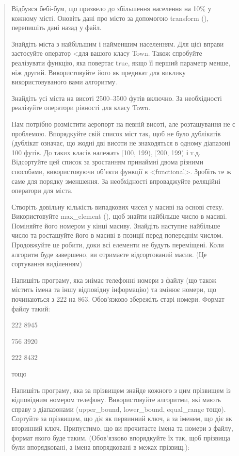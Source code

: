 \documentclass[]{article}
\begin{document}
\begin{quote}
Відбувся бебі-бум, що призвело до збільшення населення на 10\% у кожному
місті. Оновіть дані про місто за допомогою transform (), перепишіть дані
назад у файл.

Знайдіть міста з найбільшим і найменшим населенням. Для цієї вправи
застосуйте оператор \textless{}для вашого класу Town. Також спробуйте
реалізувати функцію, яка повертає true, якщо її перший параметр менше,
ніж другий. Використовуйте його як предикат для виклику
використовуваного вами алгоритму.

Знайдіть усі міста на висоті 2500--3500 футів включно. За необхідності
реалізуйте оператори рівності для класу Town.

Нам потрібно розмістити аеропорт на певній висоті, але розташування не є
проблемою. Впорядкуйте свій список міст так, щоб не було дублікатів
(дублікат означає, що жодні дві висоти не знаходяться в одному діапазоні
100 футів. До таких класів належать {[}100, 199), {[}200, 199) і т.д.
Відсортуйте цей список за зростанням принаймні двома різними способами,
використовуючи об'єкти функції в \textless{}functional\textgreater{}.
Зробіть те ж саме для порядку зменшення. За необхідності впроваджуйте
реляційні оператори для міста.

Створіть довільну кількість випадкових чисел у масиві на основі стеку.
Використовуйте max\_element (), щоб знайти найбільше число в масиві.
Поміняйте його номером у кінці масиву. Знайдіть наступне найбільше число
та росташуйте його в масиві в позиції перед попереднім числом.
Продовжуйте це робити, доки всі елементи не будуть переміщені. Коли
алгоритм буде завершено, ви отримаєте відсортований масив. (Це
сортування виділенням)

Напишіть програму, яка знімає телефонні номери з файлу (що також містить
імена та іншу відповідну інформацію) та змінює номери, що починаються з
222 на 863. Обов'язково збережіть старі номери. Формат файлу такий:

222 8945

756 3920

222 8432

тощо

Напишіть програму, яка за прізвищем знайде кожного з цим прізвищем із
відповідним номером телефону. Використовуйте алгоритми, які мають справу
з діапазонами (upper\_bound, lower\_bound, equal\_range тощо). Сортуйте
за прізвищем, що діє як первинний ключ, а за іменем, що діє як вторинний
ключ. Припустимо, що ви прочитаєте імена та номери з файлу, формат якого
буде таким. (Обов'язково впорядкуйте їх так, щоб прізвища були
впорядковані, а імена впорядковані в межах прізвищ.):


\end{quote}
\end{document}
